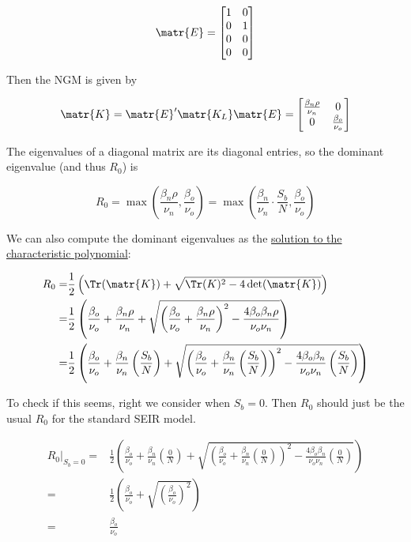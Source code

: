 \documentclass[11pt]{article}
\begin{document}
\[ \matr{E} = \begin{bmatrix} 1 & 0 \\ 0 & 1 \\ 0 & 0 \\ 0 & 0 \end{bmatrix} \]

Then the NGM is given by

\[
	\matr{K} = \matr{E}^\prime \matr{K_L} \matr{E} = 
	\begin{bmatrix} 
	\frac{\beta_n \rho}{\nu_n} & 0 \\
0 & \frac{\beta_o}{\nu_o} \\ \end{bmatrix}
\]

The eigenvalues of a diagonal matrix are its diagonal entries, so the dominant eigenvalue (and thus \( R_0 \)) is 

\[ R_0 = \max \left( \frac{\beta_n \rho}{\nu_n}, \frac{\beta_o}{\nu_o} \right) = \max \left( \frac{\beta_n}{\nu_n} \cdot \frac{S_b}{N}, \frac{\beta_o}{\nu_o} \right) \]

We can also compute the dominant eigenvalues as the \href{https://en.wikipedia.org/wiki/Eigenvalue_algorithm#2.C3.972_matrices}{solution to the characteristic polynomial}: 


\begin{align*}
	R_0 =& \frac{1}{2} \left( \Tr(\matr{K}) + \sqrt{\Tr({K})^2 - 4\det(\matr{K})} \right)\\
	=&	\frac{1}{2} \left( \frac{\beta_o}{\nu_o} + \frac{\beta_n \rho}{\nu_n} + \sqrt{\left( \frac{\beta_o}{\nu_o} + \frac{\beta_n \rho}{\nu_n} \right)^{2} - \frac{ 4 \beta_o \beta_n \rho}{\nu_o \nu_n}}\right)\\
	=&	\frac{1}{2} \left( \frac{\beta_o}{\nu_o} + \frac{\beta_n}{\nu_n}\left(\frac{S_b}{N}\right) + \sqrt{\left( \frac{\beta_o}{\nu_o} + \frac{\beta_n}{\nu_n}\left(\frac{S_b}{N}\right) \right)^{2} - \frac{ 4 \beta_o \beta_n}{\nu_o \nu_n}\left(\frac{S_b}{N}\right)}\right)
\end{align*}


To check if this seems, right we consider when \( S_b = 0 \).
Then \( R_0 \) should just be the usual \(  R_0 \) for the standard SEIR model.



\begin{align*}
	R_0\rvert_{S_b = 0} =& \frac{1}{2} \left( \frac{\beta_o}{\nu_o} + \frac{\beta_n}{\nu_n}\left(\frac{0}{N}\right) + \sqrt{\left( \frac{\beta_o}{\nu_o} + \frac{\beta_n}{\nu_n}\left(\frac{0}{N}\right) \right)^{2} - \frac{ 4 \beta_o \beta_n}{\nu_o \nu_n}\left(\frac{0}{N}\right)}\right)\\
	=& \frac{1}{2} \left( \frac{\beta_o}{\nu_o} + \sqrt{\left( \frac{\beta_o}{\nu_o} \right)^{2}}\right)\\
	=& \frac{\beta_o}{\nu_o}
\end{align*}
\end{document}
